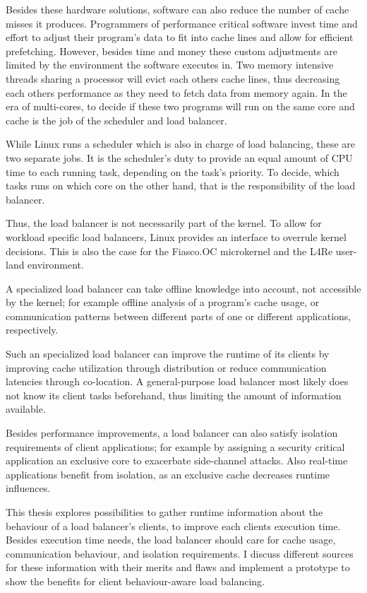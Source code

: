 Besides these hardware solutions, software can also reduce the number of cache
misses it produces.
Programmers of performance critical software invest time and effort to adjust
their program's data to fit into cache lines and allow for efficient prefetching.
However, besides time and money these custom adjustments are limited by the
environment the software executes in.
Two memory intensive threads sharing a processor will evict each others
cache lines, thus decreasing each others performance as they need to fetch
data from memory again.
In the era of multi-cores, to decide if these two programs will run on
the same core and cache is the job of the scheduler and load balancer.

While Linux runs a scheduler which is also in charge of load balancing, these
are two separate jobs.
It is the scheduler's duty to provide an equal amount of CPU time to each
running task, depending on the task's priority.
To decide, which tasks runs on which core on the other hand,
that is the responsibility of the load balancer.

Thus, the load balancer is not necessarily part of the kernel.
To allow for workload specific load balancers, Linux provides an interface to
overrule kernel decisions.
This is also the case for the Fiasco.OC microkernel and the L4Re user-land
environment.

A specialized load balancer can take offline knowledge into account, not
accessible by the kernel;
for example offline analysis of a program's cache usage, or communication
patterns between different parts of one or different applications,
respectively.

Such an specialized load balancer can improve the runtime of its clients by
improving cache utilization through distribution or reduce communication latencies
through co-location.
A general-purpose load balancer most likely does not know its client tasks
beforehand, thus limiting the amount of information available.

Besides performance improvements, a load balancer can also satisfy isolation
requirements of client applications; for example by assigning a security
critical application an exclusive core to exacerbate side-channel attacks.
Also real-time applications benefit from isolation, as an exclusive cache
decreases runtime influences.
\pagebreak

This thesis explores possibilities to gather runtime information about the
behaviour of a load balancer's clients, to improve each clients execution time.
Besides execution time needs, the load balancer should care for cache usage,
communication behaviour, and isolation requirements.
I discuss different sources for these information with their merits and flaws and
implement a prototype to show the benefits for client behaviour-aware load
balancing.
\\


